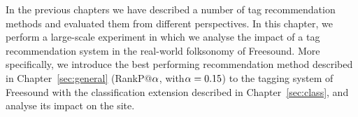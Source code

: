 
In the previous chapters we have described a number of tag recommendation methods and evaluated them from different perspectives. In this chapter, we perform a large-scale experiment in which we analyse the impact of a tag recommendation system in the real-world folksonomy of Freesound. More specifically, we introduce the best performing recommendation method described in Chapter~\ref{sec:general} (RankP@$\alpha$, with$\alpha=0.15$) to the tagging system of Freesound with the classification extension described in Chapter~\ref{sec:class}, and analyse its impact on the site.

